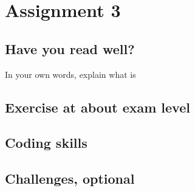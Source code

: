 \documentclass[../../assignments/assignments]{subfiles}
\begin{document}
\section{Assignment 3}




\subsection{Have you read well?}


\begin{exercise}
In your own words, explain what is
\begin{hint}
\end{hint}
\begin{solution}
\end{solution}
\end{exercise}




\subsection{Exercise at about exam level}



\subsection{Coding skills}




\subsection{Challenges, optional}
\end{document}
